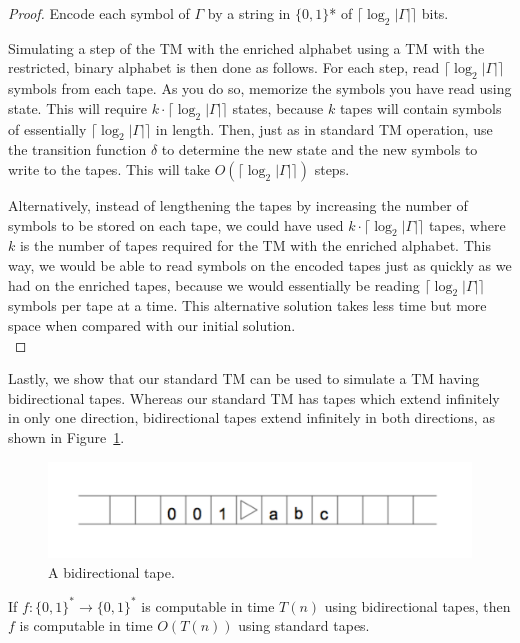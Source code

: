 \documentclass[usletter]{article}
\begin{document}
\begin{proof}
Encode each symbol of $\Gamma$ by a string in $\{0,1\}$* of $\lceil\log_2|\Gamma|\rceil$ bits.

Simulating a step of the TM with the enriched alphabet using a TM with the restricted, binary alphabet is then done as follows. For each step, read $\lceil\log_2|\Gamma|\rceil$ symbols from each tape. As you do so, memorize the symbols you have read using state. This will require $k\cdot\lceil\log_2|\Gamma|\rceil$ states, because $k$ tapes will contain symbols of essentially $\lceil\log_2|\Gamma|\rceil$ in length. Then, just as in standard TM operation, use the transition function $\delta$ to determine the new state and the new symbols to write to the tapes. This will take $O(\lceil\log_2|\Gamma|\rceil)$ steps.


Alternatively, instead of lengthening the tapes by increasing the number of symbols to be stored on each tape, we could have used $k\cdot\lceil\log_2|\Gamma|\rceil$ tapes, where $k$ is the number of tapes required for the TM with the enriched alphabet. This way, we would be able to read symbols on the encoded tapes just as quickly as we had on the enriched tapes, because we would essentially be reading $\lceil\log_2|\Gamma|\rceil$ symbols per tape at a time. This alternative solution takes less time but more space when compared with our initial solution.\\

\end{proof}

Lastly, we show that our standard TM can be used to simulate a TM having bidirectional tapes. Whereas our standard TM has tapes which extend infinitely in only one direction, bidirectional tapes extend infinitely in both directions, as shown in Figure~\ref{fig:bidirectional}.

\begin{figure}[h!]
\begin{center}
\includegraphics[width=.6\textwidth]{bidirectional}
\end{center}
\caption{A bidirectional tape.}
\label{fig:bidirectional}
\end{figure}

\begin{definition}
If $f : \{0,1\}^* \rightarrow \{0,1\}^*$ is computable in time $T(n)$ using bidirectional tapes, then $f$ is computable in time $O(T(n))$ using standard tapes.
\end{definition}
\end{document}

